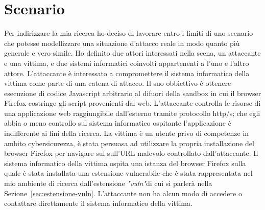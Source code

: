 \documentclass{sapthesis}
\newcommand{\Sezione}[1]{Sezione~\ref{#1}}
\newcommand{\vuln}{\textit{"vuln"}}
\begin{document}
    \section{Scenario}
    \label{sec:threat-scenario}
        Per indirizzare la mia ricerca ho deciso di lavorare entro i limiti di uno scenario
        che potesse modellizzare una situazione d'attacco reale in modo quanto più generale e vero-simile.
        Ho definito due attori interessati nella scena, un attaccante e una vittima, e due sistemi
        informatici coinvolti appartenenti a l'uno e l'altro attore.
        L'attaccante è interessato a compromettere il sistema informatico della vittima come parte di 
        una catena di attacco. Il suo obbiettivo è ottenere esecuzione di codice Javascript arbitrario
        al difuori della sandbox in cui il browser Firefox costringe gli script provenienti dal web.
        L'attaccante controlla le risorse di una applicazione web raggiungibile dall'esterno tramite 
        protocollo http/s; che egli abbia o meno controllo sul sistema informatico ospitante l'applicazione
        è indifferente ai fini della ricerca.
        La vittima è un utente privo di competenze in ambito cybersicurezza, è stata persuasa ad utilizzare
        la propria installazione del browser Firefox per navigare sul sull'URL malevolo controllato
        dall'attaccante.
        Il sistema informatico della vittima ospita una istanza del browser Firefox sulla
        quale è stata installata una estensione vulnerabile che è stata rappresentata nel mio ambiente
        di ricerca dall'estensione \vuln di cui si parlerà nella \Sezione{sec:estensione-vuln}.
        L'attaccante non ha alcun modo di accedere o contattare direttamente il sistema informatico della vittima. 
\end{document}
